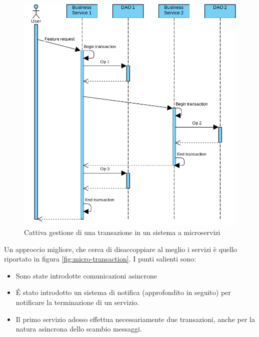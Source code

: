 \begin{figure}[h]
	\centering
	\includegraphics[width=\textwidth]{img/microservices-transaction-error}
	\caption{Cattiva gestione di una transazione in un sistema a microservizi}
	\label{fig:micro-transaction-err}
\end{figure}

Un approccio migliore, che cerca di disaccoppiare al meglio i servizi è quello riportato in figura \ref{fig:micro-transaction}.
I punti salienti sono:
\begin{itemize}
	\item Sono state introdotte comunicazioni asincrone
	\item \'E stato introdotto un sistema di notifica (approfondito in seguito) per notificare la terminazione di un servizio.
	\item Il primo servizio adesso effettua necessariamente due transazioni, anche per la natura asincrona dello scambio messaggi.
\end{itemize}

